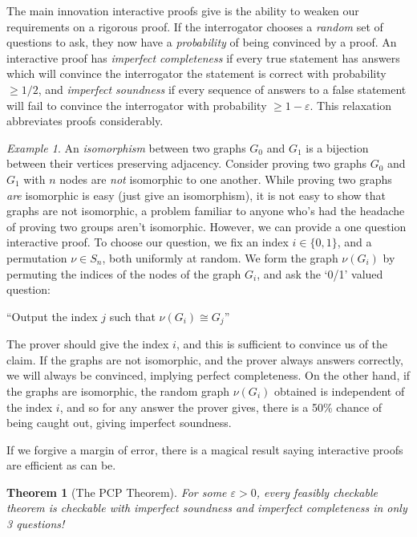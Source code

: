 \documentclass{article}
\theoremstyle{plain}
\newtheorem{theorem}{Theorem}
\theoremstyle{remark}
\newtheorem*{example}{Example}
\theoremstyle{definition}
\begin{document}
\begin{multicols}{2}
The main innovation interactive proofs give is the ability to weaken our requirements on a rigorous proof. If the interrogator chooses a {\it random} set of questions to ask, they now have a {\it probability} of being convinced by a proof. An interactive proof has {\it imperfect completeness} if every true statement has answers which will convince the interrogator the statement is correct with probability $\geq 1/2$, and {\it imperfect soundness} if every sequence of answers to a false statement will fail to convince the interrogator with probability $\geq 1 - \varepsilon$. This relaxation abbreviates proofs considerably.

\begin{example}
    An {\it isomorphism} between two graphs $G_0$ and $G_1$ is a bijection between their vertices preserving adjacency. Consider proving two graphs $G_0$ and $G_1$ with $n$ nodes are {\it not} isomorphic to one another. While proving two graphs {\it are} isomorphic is easy (just give an isomorphism), it is not easy to show that graphs are not isomorphic, a problem familiar to anyone who's had the headache of proving two groups aren't isomorphic. However, we can provide a one question interactive proof. To choose our question, we fix an index $i \in \{ 0, 1 \}$, and a permutation $\nu \in S_n$, both uniformly at random. We form the graph $\nu(G_i)$ by permuting the indices of the nodes of the graph $G_i$, and ask the `0/1' valued question:
%
\begin{center}
    ``Output the index $j$ such that $\nu(G_i) \cong G_j$''
\end{center}
%
The prover should give the index $i$, and this is sufficient to convince us of the claim. If the graphs are not isomorphic, and the prover always answers correctly, we will always be convinced, implying perfect completeness. On the other hand, if the graphs are isomorphic, the random graph $\nu(G_i)$ obtained is independent of the index $i$, and so for any answer the prover gives, there is a 50\% chance of being caught out, giving imperfect soundness.
\end{example}

If we forgive a margin of error, there is a magical result saying interactive proofs are efficient as can be.

\begin{theorem}[The PCP Theorem]
    For some $\varepsilon > 0$, every feasibly checkable theorem is checkable with imperfect soundness and imperfect completeness in only 3 questions!
\end{theorem}


\end{multicols}
\end{document}
